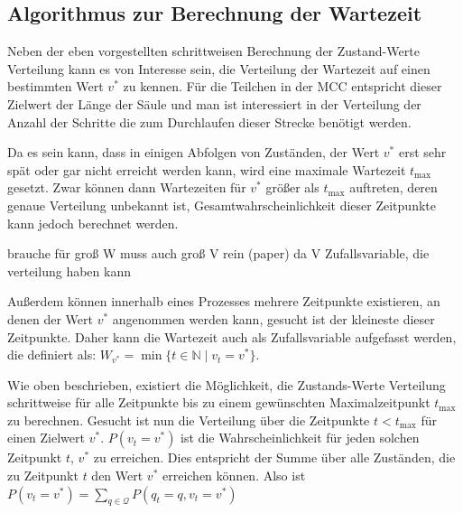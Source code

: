 \subsection{Algorithmus zur Berechnung der Wartezeit}

Neben der eben vorgestellten schrittweisen Berechnung der Zustand-Werte Verteilung kann es von Interesse sein, die Verteilung der Wartezeit auf einen bestimmten Wert $v^*$ zu kennen. Für die Teilchen in der MCC entspricht dieser Zielwert der Länge der Säule und man ist interessiert in der Verteilung der Anzahl der Schritte die zum Durchlaufen dieser Strecke benötigt werden. 

Da es sein kann, dass in einigen Abfolgen von Zuständen, der Wert $v^*$ erst sehr spät oder gar nicht erreicht werden kann, wird eine maximale Wartezeit $t_{\text{max}}$ gesetzt. Zwar können dann Wartezeiten für $v^*$ größer als $t_{\text{max}}$ auftreten, deren genaue Verteilung unbekannt ist, Gesamtwahrscheinlichkeit dieser Zeitpunkte kann jedoch berechnet werden.

brauche für groß W muss auch groß V rein (paper) da V Zufallsvariable, die verteilung haben kann

Außerdem können innerhalb eines Prozesses mehrere Zeitpunkte existieren, an denen der Wert $v^*$ angenommen werden kann, gesucht ist der kleineste dieser Zeitpunkte. %
Daher kann die Wartezeit auch als Zufallsvariable aufgefasst werden, die definiert als: $W_{v^*} = \min\{t \in \mathbb{N}\mid v_t = v^*\}$.

Wie oben beschrieben, existiert die Möglichkeit, die Zustands-Werte Verteilung schrittweise für alle Zeitpunkte bis zu einem gewünschten Maximalzeitpunkt $t_{\text{max}}$ zu berechnen.
Gesucht ist nun die Verteilung über die Zeitpunkte $t < t_{\text{max}}$ für einen Zielwert $v^*$. $P(v_{t} = v^*)$ ist die Wahrscheinlichkeit für jeden solchen Zeitpunkt $t$, $v^*$  zu erreichen. Dies entspricht der Summe über alle Zuständen, die zu Zeitpunkt $t$ den Wert $v^*$ erreichen können. Also ist $P(v_t = v^*)  = \sum_{q \in \mathcal{Q}} P(q_{t} = q, v_{t} = v^*)$


